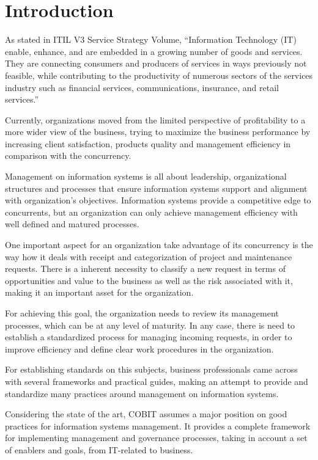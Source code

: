 
% 
% 

\section{Introduction}

As stated in ITIL V3 Service Strategy Volume, ``Information Technology (IT) enable, enhance, and are embedded in a growing number of goods and services. They are connecting consumers and producers of services in ways previously not feasible, while contributing to the productivity of numerous sectors of the services industry such as financial services, communications, insurance, and retail services.\cite{itilSS}''\par
Currently, organizations moved from the limited perspective of profitability to a more wider view of the business, trying to maximize the business performance by increasing client satisfaction, products quality and management efficiency in comparison with the concurrency.\par
Management on information systems is all about leadership, organizational structures and processes that ensure information systems support and alignment with organization's objectives. Information systems provide a competitive edge to concurrents, but an organization can only achieve management efficiency with well defined and matured processes. \par
One important aspect for an organization take advantage of its concurrency is the way how it deals with receipt and categorization of project and maintenance requests. There is a inherent necessity to classify a new request in terms of opportunities  and value to the business as well as the risk associated with it, making it an important asset for the organization.\par
For achieving this goal, the organization needs to review its management processes, which can be at any level of maturity. In any case, there is need to establish a standardized process for managing incoming requests, in order to improve efficiency and define clear work procedures in the organization.\par
For establishing standards on this subjects, business professionals came across with several frameworks and practical guides, making an attempt to provide and standardize many practices around management on information systems.\par
Considering the state of the art, COBIT assumes a major position on good practices for information systems management. It provides a complete framework for implementing management and governance processes, taking in account a set of enablers and goals, from IT-related to business.\par
